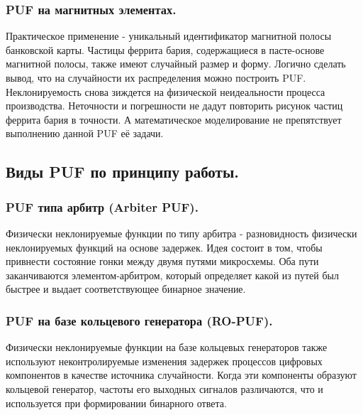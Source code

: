 \subsubsection{PUF на магнитных элементах. }
\label{sub:domain:puf_physical_types:magnetic}
Практическое применение - уникальный идентификатор магнитной полосы банковской карты. Частицы феррита бария, содержащиеся в пасте-основе магнитной полосы, также имеют случайный размер и форму. Логично сделать вывод, что на случайности их распределения можно построить PUF. Неклонируемость снова зиждется на физической неидеальности процесса производства. Неточности и погрешности не дадут повторить рисунок частиц феррита бария в точности. А математическое моделирование не препятствует выполнению данной PUF её задачи.


\subsection{Виды PUF по принципу работы. }
\label{sub:domain:puf_types}


\subsubsection{PUF типа арбитр (Arbiter PUF). }
\label{sub:domain:puf_types:arbiter}
Физически неклонируемые функции по типу арбитра - разновидность физически неклонируемых функций на основе задержек. Идея состоит в том, чтобы привнести состояние гонки между двумя путями микросхемы. Оба пути заканчиваются элементом-арбитром, который определяет какой из путей был быстрее и выдает соответствующее бинарное значение.


\subsubsection{PUF на базе кольцевого генератора (RO-PUF). }
\label{sub:domain:puf_types:ring_oscillator}
Физически неклонируемые функции на базе кольцевых генераторов также используют неконтролируемые изменения задержек процессов цифровых компонентов в качестве источника случайности. Когда эти компоненты образуют кольцевой генератор, частоты его выходных сигналов различаются, что и используется при формировании бинарного ответа.


